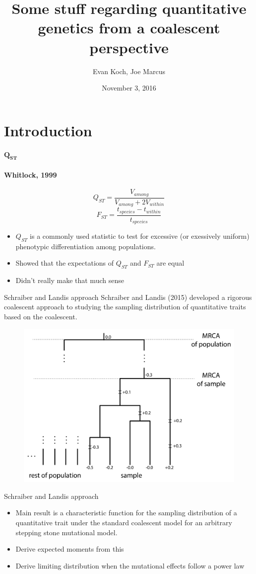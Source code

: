 \documentclass{beamer}
\title[quant gen fun]{Some stuff regarding quantitative genetics from a coalescent perspective}
\author{Evan Koch, Joe Marcus}
\date{November 3, 2016}
\begin{document}
\frame{\titlepage}
\frame{\tableofcontents}

\section{Introduction}

\begin{frame}{$\mathbf{Q_{ST}}$}
  \framesubtitle{Whitlock, 1999}
  \begin{equation*}
    Q_{ST} = \frac{V_{among}}{V_{among} + 2V_{within}}
  \end{equation*}
  \begin{equation*}
    F_{ST} = \frac{t_{species} - t_{within}}{t_{species}}
  \end{equation*}
    \begin{itemize}
  \item $Q_{ST}$ is a commonly used statistic to test for excessive (or exessively
    uniform) phenotypic differentiation among populations.
  \item Showed that the expectations of $Q_{ST}$ and $F_{ST}$ are equal
  \item Didn't really make that much sense
  \end{itemize}
\end{frame}

\begin{frame}{Schraiber and Landis approach}
  Schraiber and Landis (2015) developed a rigorous coalescent approach to
  studying the sampling distribution of quantitative traits based on the
  coalescent.
  \begin{figure}
    \includegraphics[width=.6\textwidth]{SL.png}
  \end{figure}
\end{frame}

\begin{frame}{Schraiber and Landis approach}
  \begin{itemize}
  \item Main result is a characteristic function for the sampling distribution
    of a quantitative trait under the standard coalescent model for an arbitrary
    stepping stone mutational model.
  \item Derive expected moments from this
  \item Derive limiting distribution when the mutational effects follow a power
    law
  \end{itemize}
\end{frame}
\end{document}
